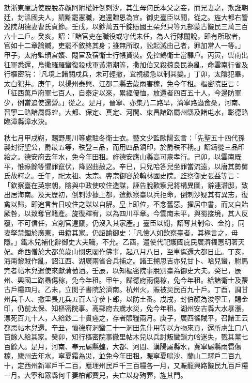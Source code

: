 \begin{pinyinscope}
劾浙東廉訪使脫脫赤顏阿附權奸倒剌沙，其生母何氏本父之妾，而兄妻之，欺誑朝廷，封溫國夫人，請黜罷憲職，追還贈恩為宜。御史臺臣以聞，從之。旌大都右警巡院胡德妻曹氏貞節。壬戌，以鈔萬五千錠賑國王朵兒只等九部蒙古饑民三萬三百六十二戶。癸亥，詔：「諸官吏在職役或守代未任，為人行賕關說，即有所取者，官如十二章論贓，吏罷不敘終其身；雖無所取，訟起滅由己者，罪加常人一等。」甲子，太府監頒宮嬪、閹宦及宿衛士行帳資裝。免控鶴衛士當驛戶。丙寅，雲南出征軍悉還，烏撒羅羅蠻復殺戍軍黃海潮等，撒加伯又殺掠良民為亂，命雲南行省及行樞密院：「凡境上諸關戍兵，未可輕撤，宜視緩急以制其變。」丁卯，太陰犯畢，太白犯井。庚午，以揚州泰興、江都二縣去歲雨害稼，免今年租。樞密院臣言：「征西萬戶府軍七百人，自泰定以來，累經優恤，放還者四百五十人，今邊防軍少，例當追使還營。」從之。是月，晉寧、亦集乃二路旱，濟寧路蟲食桑，河南、晉寧二路諸屬縣蝗，大都、保定、真定、河間、東昌諸路屬州縣及諸屯水，彰德路臨漳縣漳水決。



 秋七月甲戌朔，賜野馬川等處駐冬衛士衣。藝文少監歐陽玄言：「先聖五十四代孫襲封衍聖公，爵最五等，秩登三品，而用四品銅印，於爵秩不稱。」詔鑄從三品印給之。德安府去年水，免今年田租。旌德安應山縣高可燾孝行。己卯，以雲南既平，惟祿餘等懼罪竄伏，降詔曲赦之。辛巳，只兒哈答兒坐罪當流遠，以唐其勢舅氏故釋之。壬午，祀太祖、太宗、睿宗御容於翰林國史院。監察御史張益等言：「欽察臺在英宗朝，陰與中政使咬住造謀，誣告脫歡察兒將構異圖，辭連潛邸，致出居海南。及天歷初，倒剌沙據上都，遣欽察臺以兵拒命，倒剌沙疑其有異志，復禽以歸，即追言昔日咬住之謀以自解。皇上即位，不念舊惡，擢居中書，而又自貽厥咎，以致奪官籍產。旋復釋宥，以為四川平章。今雲南未平，與蜀接境，其人反覆，不可信任，宜削官遠竄，仍沒入其家產。」臺臣以聞，詔奪其制命、金符，同妻孥禁錮於廣東，毋籍其家。仍詔諭御史：「凡憸人如欽察臺者，其極言之，毋隱。」鐵木兒補化辭御史大夫職，不允。乙酉，遣使代祀護國庇民廣濟福惠明著天妃。命西僧於大都萬歲山憫忠閣作佛事，起八月八日，至車駕還大都日止。丁亥，海南黎賊作亂，詔江西、湖廣兩省合兵捕之。諸王搠思吉亦兒甘卜、哈兒蠻，駙馬完者帖木兒遣使來獻蒲萄酒。壬辰，以知樞密院事脫別臺為御史大夫。癸巳，辰州、興國二路蟲傷稼，免今年租。甲午，歸德府雨傷稼，免今年租。給諸衛士及蒙古戶糧四月。乙未，立閔子書院於濟南。杭州火，賑被災民百九十戶。丁酉，調甘州兵千人、撒里畏兀兵五百人守參卜郎，以防土番。戊戌，封伯顏為浚寧王，賜金印，仍前太保、知樞密院事。高郵府去歲水災，免今年租。湖州安吉縣大水暴漲，漂死百九十人，人給鈔二十貫瘞之，存者賑糧兩月。庚子，廣西徭賊平，召諸王云都思帖木兒還。辛丑，懷德府洞蠻二十一洞田先什用等以方物來貢，還所虜生口八百餘人給其家。癸卯，知行樞密院事徹里帖木兒以兵討叛蠻鎖力哈迷失，戮其黨七百餘人。是月，河南、奉元屬縣蝗，大都、河間、漢陽屬縣水，冀寧屬縣雨雹傷稼，廬州去年水，寧夏霜為災，並免今年田租，賑寧夏鳴沙、蘭山二驛戶二百九十，定西州新軍戶千二百，應理州民戶千三百糧各一月，又賑龍興路饑民九百戶糧一月。大寧和眾縣何千妻柏都賽兒，夫亡以身殉葬，旌其門。




\end{pinyinscope}
